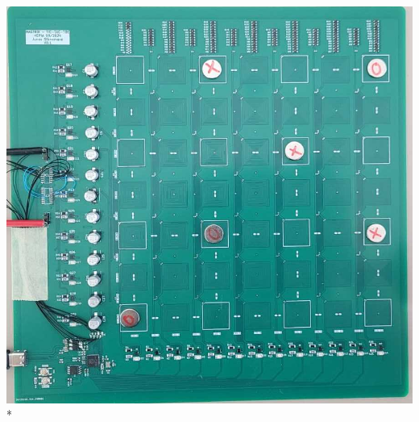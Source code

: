 \begin{spacing}{0.956}

	\vfill
	\begin{center}
		{\includegraphics[width=0.4\linewidth]{figures/front.png}}\\*
		\vfill


\end{center}
\end{spacing}
